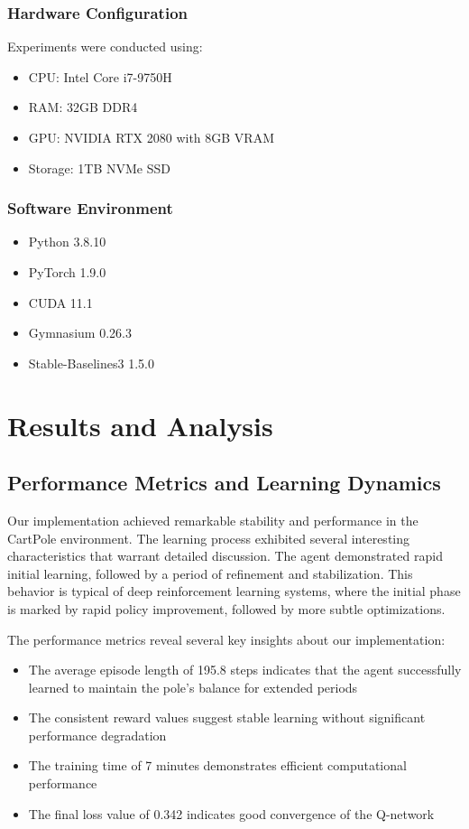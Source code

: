 \documentclass[conference]{IEEEtran}
\begin{document}
\subsubsection{Hardware Configuration}
Experiments were conducted using:
\begin{itemize}
    \item CPU: Intel Core i7-9750H
    \item RAM: 32GB DDR4
    \item GPU: NVIDIA RTX 2080 with 8GB VRAM
    \item Storage: 1TB NVMe SSD
\end{itemize}

\subsubsection{Software Environment}
\begin{itemize}
    \item Python 3.8.10
    \item PyTorch 1.9.0
    \item CUDA 11.1
    \item Gymnasium 0.26.3
    \item Stable-Baselines3 1.5.0
\end{itemize}

\section{Results and Analysis}
\subsection{Performance Metrics and Learning Dynamics}
Our implementation achieved remarkable stability and performance in the CartPole environment. The learning process exhibited several interesting characteristics that warrant detailed discussion. The agent demonstrated rapid initial learning, followed by a period of refinement and stabilization. This behavior is typical of deep reinforcement learning systems, where the initial phase is marked by rapid policy improvement, followed by more subtle optimizations.

The performance metrics reveal several key insights about our implementation:
\begin{itemize}
    \item The average episode length of 195.8 steps indicates that the agent successfully learned to maintain the pole's balance for extended periods
    \item The consistent reward values suggest stable learning without significant performance degradation
    \item The training time of 7 minutes demonstrates efficient computational performance
    \item The final loss value of 0.342 indicates good convergence of the Q-network
\end{itemize}
\end{document}
